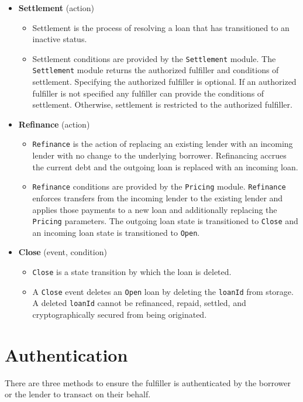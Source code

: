 \documentclass[12pt]{article}
\begin{document}
\begin{itemize}
	\item \textbf{Settlement} (action)
	\begin{itemize}
		\item Settlement is the process of resolving a loan that has transitioned to an inactive status.
		\item Settlement conditions are provided by the \texttt{Settlement} module. The \texttt{Settlement} module returns the authorized fulfiller and conditions of settlement. Specifying the authorized fulfiller is optional. If an authorized fulfiller is not specified any fulfiller can provide the conditions of settlement. Otherwise, settlement is restricted to the authorized fulfiller.
	\end{itemize}
	
	\item \textbf{Refinance} (action)
	\begin{itemize}
		\item \texttt{Refinance} is the action of replacing an existing lender with an incoming lender with no change to the underlying borrower. Refinancing accrues the current debt and the outgoing loan is replaced with an incoming loan.
		\item \texttt{Refinance} conditions are provided by the \texttt{Pricing} module. \texttt{Refinance} enforces transfers from the incoming lender to the existing lender and applies those payments to a new loan and additionally replacing the \texttt{Pricing} parameters. The outgoing loan state is transitioned to \texttt{Close} and an incoming loan state is transitioned to \texttt{Open}.
	\end{itemize}
	
	\item \textbf{Close} (event, condition)
	\begin{itemize}
		\item \texttt{Close} is a state transition by which the loan is deleted. 
		\item A \texttt{Close} event deletes an \texttt{Open} loan by deleting the \texttt{loanId} from storage. A deleted \texttt{loanId} cannot be refinanced, repaid, settled, and cryptographically secured from being originated.
	\end{itemize}
\end{itemize}

\section{Authentication}
There are three methods to ensure the fulfiller is authenticated by the borrower or the lender to transact on their behalf.
\end{document}
